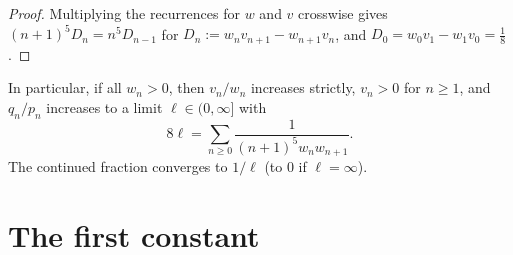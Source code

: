 \documentclass[11pt]{amsart}
\theoremstyle{definition}
\theoremstyle{remark}
\numberwithin{equation}{section}
\begin{document}
\begin{proof}
Multiplying the recurrences for $w$ and $v$ crosswise gives $(n+1)^5D_n=n^5D_{n-1}$ for $D_n:=w_nv_{n+1}-w_{n+1}v_n$, and $D_0=w_0v_1-w_1v_0=\frac18$.
\end{proof}

In particular, if all $w_n>0$, then $v_n/w_n$ increases strictly, $v_n>0$ for $n\ge1$, and $q_n/p_n$ increases to a limit $\ell\in(0,\infty]$ with
\begin{equation}\label{eq:ell}
8\ell=\sum_{n\ge0}\frac{1}{(n+1)^5w_nw_{n+1}}.
\end{equation}
The continued fraction converges to $1/\ell$ (to $0$ if $\ell=\infty$).

\section{The first constant}\label{sec:U1}
\end{document}
